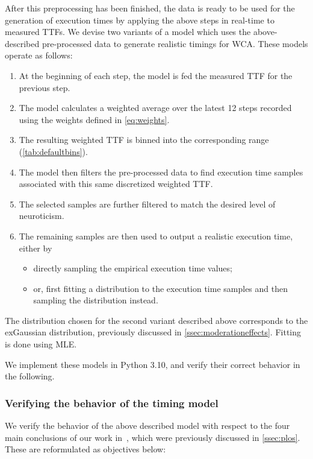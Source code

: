 After this preprocessing has been finished, the data is ready to be used for the generation of execution times by applying the above steps in real-time to measured \acp{TTF}.
We devise two variants of a model which uses the above-described pre-processed data to generate realistic timings for \ac{WCA}.
These models operate as follows:

\begin{enumerate}
    \item At the beginning of each step, the model is fed the measured \ac{TTF} for the previous step.
    \item The model calculates a weighted average over the latest \num{12} steps recorded using the weights defined in \cref{eq:weights}.
    \item The resulting weighted \ac{TTF} is binned into the corresponding range (\cref{tab:defaultbins}).
    \item The model then filters the pre-processed data to find execution time samples associated with this same discretized weighted \ac{TTF}.
    \item The selected samples are further filtered to match the desired level of neuroticism.
    \item The remaining samples are then used to output a realistic execution time, either by
    \begin{itemize}
        \item directly sampling the empirical execution time values;
        \item or, first fitting a distribution to the execution time samples and then sampling the distribution instead.
    \end{itemize}
\end{enumerate}

The distribution chosen for the second variant described above corresponds to the \ac{exGaussian} distribution, previously discussed in \cref{ssec:moderationeffects}.
Fitting is done using \ac{MLE}.

We implement these models in Python 3.10, and verify their correct behavior in the following.

\subsubsection{Verifying the behavior of the timing model}\label{ssec:model:verification}

We verify the behavior of the above described model with respect to the four main conclusions of our work in~\cite{olguinmunoz:impact2021}, which were previously discussed in \cref{ssec:plos}.
These are reformulated as objectives below:

